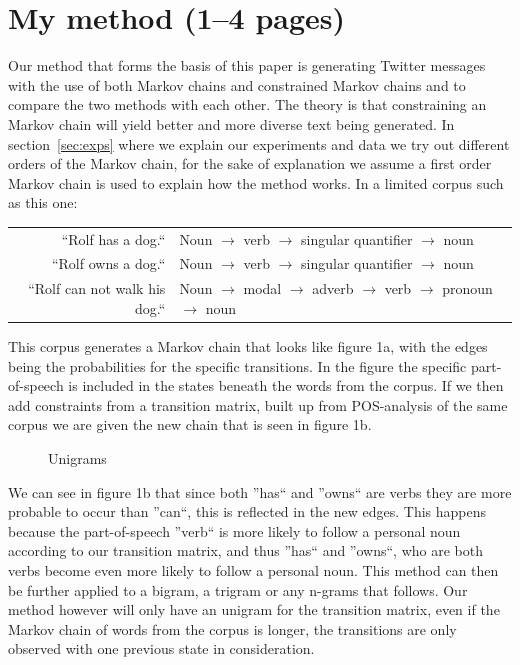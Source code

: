 \documentclass[a4paper,12pt]{article}
\begin{document}
\section{My method (1--4 pages)}
\label{sec:method}
Our method that forms the basis of this paper is generating Twitter messages with the use of both Markov chains and constrained Markov chains and to compare the two methods with each other.
The theory is that constraining an Markov chain will yield better and more diverse text being generated.
In section~\ref{sec:exps} where we explain our experiments and data we try out different orders of the Markov chain,
for the sake of explanation we assume a first order Markov chain is used to explain how the method works.
In a limited corpus such as this one: \\
\begin{tabular}{r | l}
``Rolf has a dog.`` & Noun $\to$ verb $\to$ singular quantifier $\to$ noun \\
``Rolf owns a dog.`` & Noun $\to$ verb $\to$ singular quantifier $\to$ noun \\
``Rolf can not walk his dog.`` & Noun $\to$ modal $\to$ adverb $\to$ verb $\to$ pronoun $\to$ noun \\
\end{tabular}
This corpus generates a Markov chain that looks like figure 1a, with the edges being the probabilities for the specific transitions.
In the figure the specific part-of-speech is included in the states beneath the words from the corpus.
If we then add constraints from a transition matrix, built up from POS-analysis of the same corpus we are given the new chain that is seen in figure 1b.
\begin{figure}[h!]
\hfill
{}
\hfill
{}
\hfill
\caption{Unigrams}
\end{figure}
We can see in figure 1b that since both ''has`` and ''owns`` are verbs they are more probable to occur than ''can``, this is reflected in the new edges.
This happens because the part-of-speech ''verb`` is more likely to follow a personal noun according to our transition matrix, and thus ''has`` and ''owns``, who are
both verbs become even more likely to follow a personal noun. This method can then be further applied to a bigram, a trigram or any n-grams that follows.
Our method however will only have an unigram for the transition matrix, even if the Markov chain of words from the corpus is longer,
the transitions are only observed with one previous state in consideration.
\end{document}

